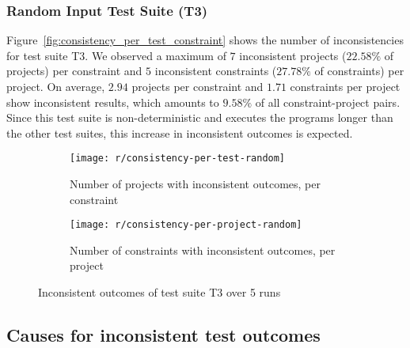 \subsubsection{Random Input Test Suite (T3)}

Figure~\ref{fig:consistency_per_test_constraint} shows the number of inconsistencies for test suite T3.
We observed a maximum of $7$ inconsistent projects ($22.58\%$ of projects) per constraint and $5$ inconsistent constraints ($27.78\%$ of constraints) per project.
On average, $2.94$ projects per constraint and $1.71$ constraints per project show inconsistent results,
which amounts to $9.58\%$ of all constraint-project pairs.
Since this test suite is non-deterministic and executes the programs longer than the other test suites,
this increase in inconsistent outcomes is expected.

\parspace

\begin{figure}[htpb]
    \centering
    \begin{subfigure}{.65\textwidth}
        \texttt{[image: r/consistency-per-test-random]}%
        \vspace{-\medskipamount}
        \caption{Number of projects with inconsistent outcomes, per constraint}
        \label{fig:consistency_per_test_random}
    \end{subfigure}
    \begin{subfigure}{.65\textwidth}
        \texttt{[image: r/consistency-per-project-random]}%
        \vspace{-\medskipamount}
        \caption{Number of constraints with inconsistent outcomes, per project}
        \label{fig:consistency_per_project_random}
    \end{subfigure}

    \caption{Inconsistent outcomes of test suite T3 over 5 runs}
    \label{fig:consistency_random}
\end{figure}

\subsection{Causes for inconsistent test outcomes}

